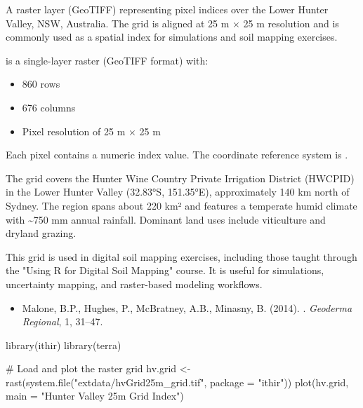 \documentclass[a4paper]{book}
\begin{document}
%
\begin{Description}
A raster layer (GeoTIFF) representing pixel indices over the Lower Hunter Valley, NSW, Australia. The grid is aligned at 25 m × 25 m resolution and is commonly used as a spatial index for simulations and soil mapping exercises.
\end{Description}
%
\begin{Format}
 is a single-layer raster (GeoTIFF format) with:
\begin{itemize}

\item{} 860 rows
\item{} 676 columns
\item{} Pixel resolution of 25 m × 25 m

\end{itemize}

Each pixel contains a numeric index value. The coordinate reference system is .
\end{Format}
%
\begin{Details}
The grid covers the Hunter Wine Country Private Irrigation District (HWCPID) in the Lower Hunter Valley (32.83°S, 151.35°E), approximately 140 km north of Sydney. The region spans about 220 km² and features a temperate humid climate with \textasciitilde{}750 mm annual rainfall. Dominant land uses include viticulture and dryland grazing.

This grid is used in digital soil mapping exercises, including those taught through the "Using R for Digital Soil Mapping" course. It is useful for simulations, uncertainty mapping, and raster-based modeling workflows.
\end{Details}
%
\begin{References}
\begin{itemize}

\item{} Malone, B.P., Hughes, P., McBratney, A.B., Minasny, B. (2014). . \emph{Geoderma Regional}, 1, 31–47.

\end{itemize}

\end{References}
%
\begin{Examples}
\begin{ExampleCode}
library(ithir)
library(terra)

# Load and plot the raster grid
hv.grid <- rast(system.file("extdata/hvGrid25m_grid.tif", package = "ithir"))
plot(hv.grid, main = "Hunter Valley 25m Grid Index")
\end{ExampleCode}
\end{Examples}
\end{document}

